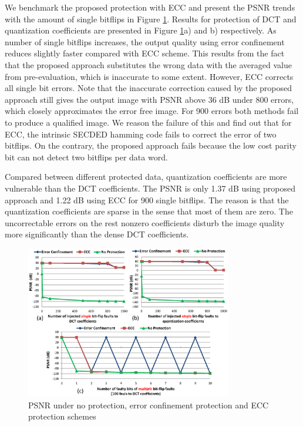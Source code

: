 We benchmark the proposed protection with ECC and present the PSNR trends with the amount of single bitflips in Figure \ref{fig:qos_snr}. Results for protection of DCT and quantization coefficients are presented in Figure \ref{fig:qos_snr}a) and b) respectively. As number of single bitflips increases, the output quality using error confinement reduces slightly faster compared with ECC scheme. This results from the fact that the proposed approach substitutes the wrong data with the averaged value from pre-evaluation, which is inaccurate to some extent. However, ECC corrects all single bit errors. Note that the inaccurate correction caused by the proposed approach still gives the output image with PSNR above 36 dB under 800 errors, which closely approximates the error free image. For 900 errors both methods fail to produce a qualified image. We reason the failure of this and find out that for ECC, the intrinsic SECDED hamming code fails to correct the error of two bitflips. On the contrary, the proposed approach fails because the low cost parity bit can not detect two bitflips per data word.

Compared between different protected data, quantization coefficients are more vulnerable than the DCT coefficients. The PSNR is only 1.37 dB using proposed approach and 1.22 dB using ECC for 900 single bitflips. The reason is that the quantization coefficients are sparse in the sense that most of them are zero. The uncorrectable errors on the rest nonzero coefficients disturb the image quality more significantly than the dense DCT coefficients.

\begin{figure}
\centering
\includegraphics[width=90mm]{./eps/qos_snr}
\caption{PSNR under no protection, error confinement protection and ECC protection schemes}
\vspace{-4mm}
\label{fig:qos_snr}
\end{figure}

